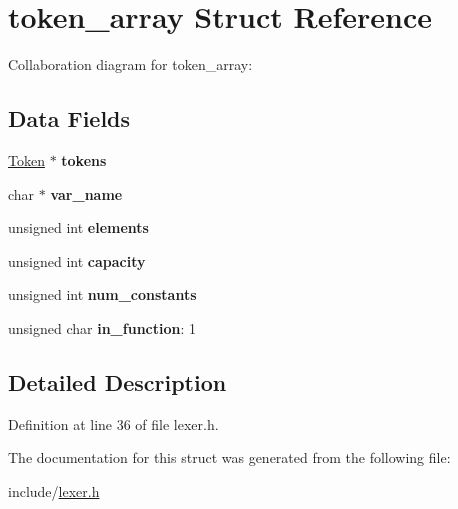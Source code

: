 \hypertarget{structtoken__array}{}\section{token\+\_\+array Struct Reference}
\label{structtoken__array}


Collaboration diagram for token\+\_\+array\+:
\subsection*{Data Fields}
\begin{DoxyCompactItemize}
\item 
\mbox{\label{structtoken__array_adfff75aea8c2f3cbd21fe3473caf06c5}} 
\hyperlink{structtoken}{Token} $\ast$ {\bfseries tokens}
\item 
\mbox{\label{structtoken__array_a64bc474df86f6fe5256a50df9cf1620e}} 
char $\ast$ {\bfseries var\+\_\+name}
\item 
\mbox{\label{structtoken__array_a3d492f5e4f8f96277f6ead5713994a41}} 
unsigned int {\bfseries elements}
\item 
\mbox{\label{structtoken__array_aa93f1215a6e91ddce63717d7a034d98d}} 
unsigned int {\bfseries capacity}
\item 
\mbox{\label{structtoken__array_a5d31065d097d17265984c8bf1bf1dbbd}} 
unsigned int {\bfseries num\+\_\+constants}
\item 
\mbox{\label{structtoken__array_aedd1f87aedc242fef390a0b6cd1e01fd}} 
unsigned char {\bfseries in\+\_\+function}\+: 1
\end{DoxyCompactItemize}


\subsection{Detailed Description}


Definition at line 36 of file lexer.\+h.



The documentation for this struct was generated from the following file\+:\begin{DoxyCompactItemize}
\item 
include/\hyperlink{lexer_8h}{lexer.\+h}\end{DoxyCompactItemize}

